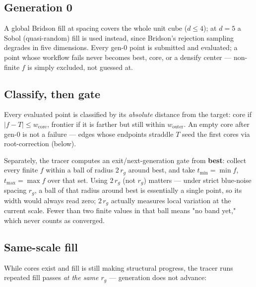 \subsection{Generation 0}

A global Bridson fill at spacing  covers the whole unit cube
($d \le 4$); at $d = 5$ a Sobol (quasi-random) fill is used instead, since Bridson's
rejection sampling degrades in five dimensions. Every gen-0 point is submitted and
evaluated; a point whose workflow fails never becomes best, core, or a densify center
--- non-finite $f$ is simply excluded, not guessed at.

\subsection{Classify, then gate}

Every evaluated point is classified by its \emph{absolute} distance from the target:
core if $\lvert f-T\rvert \le w_{\mathrm{core}}$, frontier if it is farther but still
within $w_{\mathrm{outer}}$. An empty core after gen-0 is not a failure --- edges whose
endpoints straddle $T$ seed the first cores via root-correction (below).

Separately, the tracer computes an exit/next-generation gate from \textbf{best}: collect
every finite $f$ within a ball of radius $2\,r_g$ around best, and take
$t_{\min}=\min f$, $t_{\max}=\max f$ over that set. Using $2\,r_g$ (not $r_g$) matters
--- under strict blue-noise spacing $r_g$, a ball of that radius around best is
essentially a single point, so its width would always read zero; $2\,r_g$ actually
measures local variation at the current scale. Fewer than two finite values in that ball
means "no band yet," which never counts as converged.

\subsection{Same-scale fill}
\label{sec:als-fill}

While cores exist and fill is still making structural progress, the tracer runs
repeated fill passes \emph{at the same $r_g$} --- generation does not advance:

